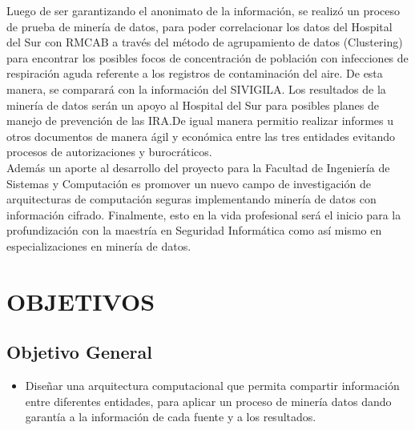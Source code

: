 \documentclass[a4paper,openright,12pt]{book}
\theoremstyle{definition}
\theoremstyle{remark}
\begin{document}
Luego de ser garantizando el anonimato de la información, se realizó un proceso de prueba de minería de datos, para poder correlacionar los datos del Hospital del Sur con RMCAB a través del método de agrupamiento de datos (Clustering) para encontrar los posibles focos de concentración de población con infecciones de respiración aguda referente a los registros de contaminación del aire. De esta manera, se comparará con la información del SIVIGILA. Los resultados de la minería de datos serán un apoyo  al Hospital del Sur para posibles planes de manejo de prevención de las IRA.De igual manera permitio realizar informes u otros documentos de manera ágil y económica entre las tres entidades evitando procesos de autorizaciones y burocráticos.\\
Además un aporte al desarrollo del proyecto para la Facultad de Ingeniería de Sistemas y Computación es promover un nuevo campo de investigación de arquitecturas de computación seguras implementando minería de datos con información cifrado. Finalmente, esto en la vida profesional será el inicio para la profundización con la maestría en Seguridad Informática como así mismo en especializaciones en minería de datos.

\section{OBJETIVOS}

\subsection{Objetivo General}
\begin{itemize}
\item Diseñar una arquitectura computacional que permita compartir información entre diferentes entidades, para aplicar un proceso de minería datos dando garantía a la información de cada fuente y a los resultados. 
\end{itemize}
\end{document}
